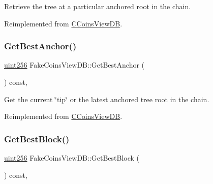 Retrieve the tree at a particular anchored root in the chain. 



Reimplemented from \mbox{\hyperlink{class_c_coins_view_d_b_aeaab3bc4b363dbbc9d9a77930209e299}{C\+Coins\+View\+DB}}.

\mbox{\label{class_fake_coins_view_d_b_af7870faf849e59188344273a03c9a1b0}} 
\subsubsection{\texorpdfstring{Get\+Best\+Anchor()}{GetBestAnchor()}}
{\footnotesize\ttfamily \mbox{\hyperlink{classuint256}{uint256}} Fake\+Coins\+View\+D\+B\+::\+Get\+Best\+Anchor (\begin{DoxyParamCaption}{ }\end{DoxyParamCaption}) const\hspace{0.3cm}{\ttfamily [inline]}, {\ttfamily [virtual]}}



Get the current \char`\"{}tip\char`\"{} or the latest anchored tree root in the chain. 



Reimplemented from \mbox{\hyperlink{class_c_coins_view_d_b_a2bb7d73a96472def92e332a4563a689c}{C\+Coins\+View\+DB}}.

\mbox{\label{class_fake_coins_view_d_b_a36231d924114fbe51a830c9c235c50ad}} 
\subsubsection{\texorpdfstring{Get\+Best\+Block()}{GetBestBlock()}}
{\footnotesize\ttfamily \mbox{\hyperlink{classuint256}{uint256}} Fake\+Coins\+View\+D\+B\+::\+Get\+Best\+Block (\begin{DoxyParamCaption}{ }\end{DoxyParamCaption}) const\hspace{0.3cm}{\ttfamily [inline]}, {\ttfamily [virtual]}}



